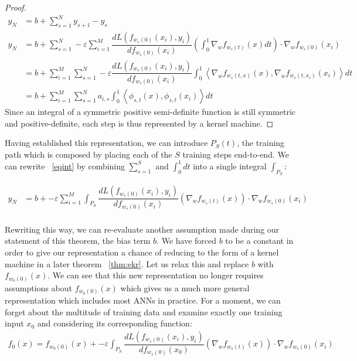 \begin{proof}
\begin{align*}
y_N &= b + \sum_{s=1}^N y_{s+1} - y_s\\
y_N &= b + \sum_{s = 1}^N -\varepsilon \sum_{i = 1}^{M} \dfrac{d
      L(f_{w_s(0)}(x_i),  y_i)}{d f_{w_s(0)}(x_i)}
      \left(\int_0^1\nabla_w f_{w_s(t)}(x)dt\right) \cdot \nabla_w
      f_{w_s(0)}(x_i)\\   \label{eqint}
&= b + \sum_{i = 1}^{M}\sum_{s = 1}^N -\varepsilon  \dfrac{d L(f_{w_s(0)}(x_i),  y_i)}{d f_{w_s(0)}(x_i)}  \int_0^1\left\langle \nabla_w f_{w_s(t,x)}(x), \nabla_w f_{w_s(t,x_i)}(x_i) \right\rangle dt\\ 
&= b + \sum_{i = 1}^{M}\sum_{s = 1}^N a_{i, s}  \int_0^1 \left\langle \phi_{s,t}(x), \phi_{s,t}(x_i)\right\rangle dt
\end{align*}
Since an integral of a symmetric positive semi-definite function is still symmetric and positive-definite, each step is thus represented by a kernel machine. 

\end{proof}

Having established this representation, we can introduce $P_S(t)$, the
training path which is composed by placing each of the $S$ training
steps end-to-end. We can rewrite ~\ref{eqint} by combining $\sum_{s =
  1}^S$ and $\int_0^1 dt$ into a single integral $\int_{P_S}$:

\begin{align}
y_N &= b +  -\varepsilon \sum_{i = 1}^{M} \int_{P_S} \dfrac{d
      L(f_{w_s(0)}(x_i),  y_i)}{d f_{w_s(0)}(x_i)}
      \left(\nabla_w f_{w_s(t)}(x)\right) \cdot \nabla_w
      f_{w_s(0)}(x_i)\\   \label{eqint}
\end{align}

Rewriting this way, we can re-evaluate another assumption made during
our statement of this theorem, the bias term $b$. We have forced $b$
to be a constant in order to give our representation a chance of
reducing to the form of a kernel machine in a later theorem
~\ref{thm:ekr}. Let us relax this and replace $b$ with
$f_{w_0(0)}(x)$. We can see that this new representation no longer
requires assumptions about $f_{w_0(0)}(x)$ which gives us a much more
general representation which includes most ANNs in practice. 
For a moment, we can forget about the multitude of training data and
examine exactly one training input $x_0$ and considering its
corresponding function:
\begin{align}
f_0(x) = f_{w_0(0)}(x) +  -\varepsilon \int_{P_S} \dfrac{d
      L(f_{w_s(0)}(x_i),  y_i)}{d f_{w_s(0)}(x_0)}
      \left(\nabla_w f_{w_s(t)}(x)\right) \cdot \nabla_w
      f_{w_s(0)}(x_i)\\   \label{eqint}
\end{align}

